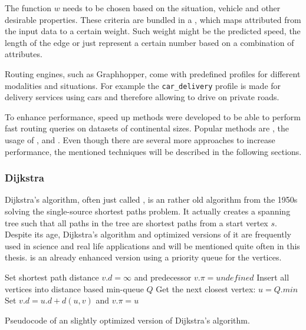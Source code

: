 		The function $w$ needs to be chosen based on the situation, vehicle and other desirable properties.
		These criteria are bundled in a , which maps attributed from the input data to a certain weight.
		Such weight might be the predicted speed\cite{graphhopper-profile-bike-speeds}, the length of the edge\cite{graphhopper-profile-shortest} or just represent a certain number based on a combination of attributes\cite{graphhopper-profile-short-fastest}.
		
		Routing engines, such as Graphhopper, come with predefined profiles for different modalities and situations.
		For example the \texttt{car\_delivery} profile is made for delivery services using cars and therefore allowing to drive on private roads\cite{graphhopper-routing-profiles}.
		
		To enhance performance, speed up methods were developed to be able to perform fast routing queries on datasets of continental sizes.
		Popular methods are , the usage of ,  and .
		Even though there are several more approaches to increase performance, the mentioned techniques will be described in the following sections.
		
		\subsubsection{Dijkstra}
		\label{subsubsec:dijkstra}
		
			Dijkstra's algorithm, often just called , is an rather old algorithm from the 1950s solving the single-source shortest paths problem.
			It actually creates a spanning tree such that all paths in the tree are shortest paths from a start vertex $s$.
			Despite its age, Dijkstra's algorithm and optimized versions of it are frequently used in science and real life applications and will be mentioned quite often in this thesis.
			 is an already enhanced version using a priority queue for the vertices\cite[658]{cormen-introduction-to-alg}.
			
			\begin{algorithm}[h]
				\begin{algorithmic}[1]
						\State Set shortest path distance $v.d = \infty$ and predecessor $v.\pi = undefined$
					\EndFor
					\State Insert all vertices into distance based min-queue $Q$
					\State
						\State Get the next closest vertex: $u = Q.min$ \label{alg:dijkstra:extract-queue}
								\State Set $v.d = u.d + d(u, v)$ and $v.\pi = u$
							\EndIf
						\EndFor
					\EndWhile
				\end{algorithmic}
				\caption{Pseudocode of an slightly optimized version of Dijkstra's algorithm.}
				\label{alg:dijkstra}
			\end{algorithm}
		
